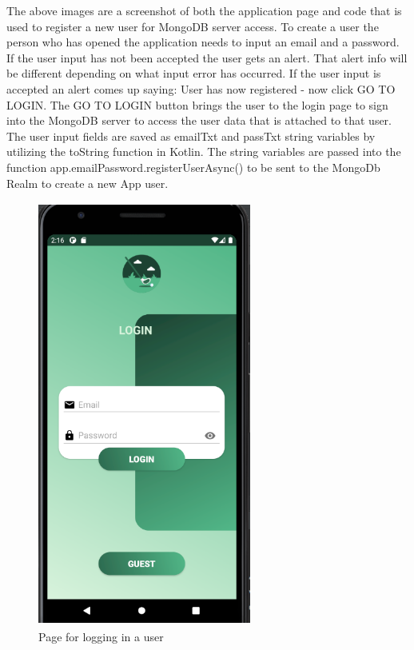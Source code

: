 The above images are a screenshot of both the application page and code that is used to register a new user for MongoDB server access. To create a user the person who has opened the application needs to input an email and a password. If the user input has not been accepted the user gets an alert. That alert info will be different depending on what input error has occurred. If the user input is accepted an alert comes up saying: User has now registered - now click GO TO LOGIN. The GO TO LOGIN button brings the user to the login page to sign into the MongoDB server to access the user data that is attached to that user.
\newline
The user input fields are saved as emailTxt and passTxt string variables by utilizing the toString function in Kotlin. The string variables are passed into the function app.emailPassword.registerUserAsync() to be sent to the MongoDb Realm to create a new App user.
\begin{figure}[H]
    \centering
    \includegraphics[width=7cm, height = 14cm]{img/loginPage.PNG}
    \caption{Page for logging in a user}
    \label{fig:altas config}
\end{figure}

